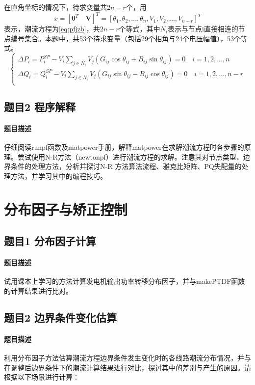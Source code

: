 \documentclass[a4paper,12pt]{article}
\newcommand{\vect}[1]{\boldsymbol{#1}}
\begin{document}
    在直角坐标的情况下，待求变量共$2n-r$个，用
    $$x=[\vect{\theta}^T \quad \vect{V}]^T=[\theta_1,\theta_2,...,\theta_n,V_1,V_2,...,V_{n-r}]^T$$ 表示，潮流方程为\cref{eq:pfjzb}，共$2n-r$个等式，其中$N_i$表示与节点i直接相连的节点编号集合。本题中，共53个待求变量（包括29个相角与24个电压幅值），53个等式。
    \begin{equation}
      \label{eq:pfjzb}
      \begin{cases}
        \Delta P_i = P^{SP}_i - V_i \sum_{j\in N_i}V_j(G_{ij}\cos \theta_{ij}+B_{ij}\sin \theta_{ij}) = 0 \quad i=1,2,...,n\\
        \Delta Q_i = Q^{SP}_i - V_i \sum_{j\in N_i}V_j(G_{ij}\sin \theta_{ij}-B_{ij}\cos \theta_{ij}) = 0 \quad i = 1,2,...,n-r\\
      \end{cases}
    \end{equation}

    \subsection{题目2 程序解释}
    \paragraph{题目描述} 仔细阅读runpf函数及matpower手册，解释matpower在求解潮流方程时各步骤的原理。尝试使用N-R方法（newtonpf）进行潮流方程的求解。注意其对节点类型、边界条件的处理方法，分析并探讨N-R 方法算法流程、雅克比矩阵、PQ失配量的处理方法，并学习其中的编程技巧。

    \section{分布因子与矫正控制}
    \subsection{题目1 分布因子计算}
    \paragraph{题目描述} 试用课本上学习的方法计算发电机输出功率转移分布因子，并与makePTDF函数的计算结果进行比对。

    \subsection{题目2 边界条件变化估算}
    \paragraph{题目描述} 利用分布因子方法估算潮流方程边界条件发生变化时的各线路潮流分布情况，并与在调整后边界条件下的潮流计算结果进行对比，探讨其中的差别与产生的原因。请根据以下场景进行计算：
\end{document}
